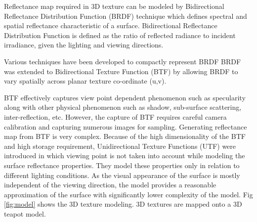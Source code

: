 Reflectance map required in 3D texture can be modeled by Bidirectional Reflectance Distribution
Function (BRDF) \cite{chap2-22} technique which defines spectral and spatial reflectance characteristic of a
surface.
Bidirectional Reflectance Distribution Function is defined as the ratio of reflected radiance to
incident irradiance, given the lighting and viewing directions. 

Various techniques have been developed to compactly
represent BRDF \cite{chap2-18, chap2-19, chap2-20, chap2-21}
BRDF was extended to Bidirectional Texture Function (BTF) \cite{C2} by 
allowing BRDF to vary spatially
across planar texture co-ordinate (u,v).

BTF effectively captures view point dependent phenomenon such as specularity
along with other physical phenomenon such as shadow, sub-surface scattering,
inter-reflection, etc. However, the capture of BTF requires careful camera
calibration and capturing numerous images for sampling. Generating reflectance
map from BTF is very complex.
Because of the  high dimensionality of the BTF and high storage requirement,
Unidirectional Texture Functions (UTF) were introduced in which viewing point is
not taken into account while modeling the surface reflectance properties. They
model these properties only in relation to different lighting conditions. As the
visual appearance of the surface is mostly independent of the viewing direction,
the model provides a reasonable approximation of the surface with significantly
lower complexity of the model. Fig \ref{fig:model} shows the 3D texture modeling. 3D textures are mapped 
onto a 3D teapot model.

